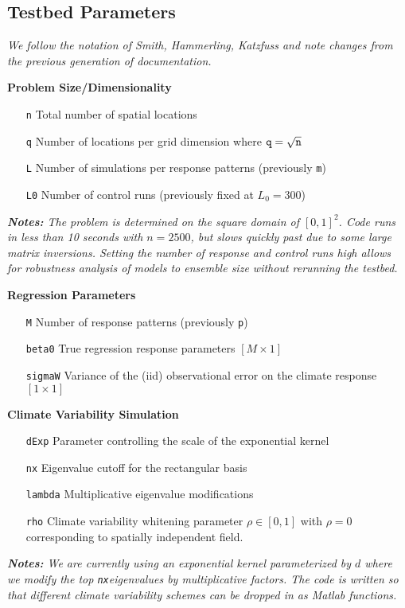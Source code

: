 \documentclass[11pt]{article}
\begin{document}
\newpage
\subsection{Testbed Parameters}
\emph{We follow the notation of Smith, Hammerling, Katzfuss and note changes from the previous generation of documentation. }

\textbf{Problem Size/Dimensionality}

\begin{itemize}
\item[ \texttt{n}] Total number of spatial locations 
\item[\texttt{q}] Number of locations per grid dimension where $\text{\texttt{q}} = \sqrt{\text{\texttt{n}}}$
\item[\texttt{L}] Number of simulations per response patterns (previously \texttt{m})
\item[\texttt{L0}] Number of control runs (previously fixed at $L_0 = 300$)
\end{itemize}


\emph{\textbf{Notes: }The problem is determined on the square domain of $[0,1]^2$. Code runs in less than 10 seconds with $n=2500$, but slows quickly past due to some large matrix inversions. Setting the number of response and control runs high allows for robustness analysis of models to ensemble size without rerunning the testbed.}

\textbf{Regression Parameters}
\begin{itemize}
\item[\texttt{M}] Number of response patterns  (previously \texttt{p})
\item[ \texttt{beta0}] True regression response parameters $[M \times 1]$
\item[\texttt{sigmaW}] Variance of the (iid) observational error on the climate response $[1 \times 1]$
\end{itemize}

\textbf{Climate Variability Simulation}
\begin{itemize}
\item[ \texttt{dExp}] Parameter controlling the scale of the exponential kernel
\item[\texttt{nx}] Eigenvalue cutoff for the rectangular basis
\item[\texttt{lambda}] Multiplicative eigenvalue modifications
\item[\texttt{rho}] Climate variability whitening parameter $\rho \in [0,1]$ with $\rho=0$ corresponding to spatially independent field.
\end{itemize}
\emph{\textbf{Notes: }We are currently using an exponential kernel parameterized by $d$ where we modify the top \texttt{nx}eigenvalues by multiplicative factors. The code is written so that different climate variability schemes can be dropped in as Matlab functions.}
\end{document}
